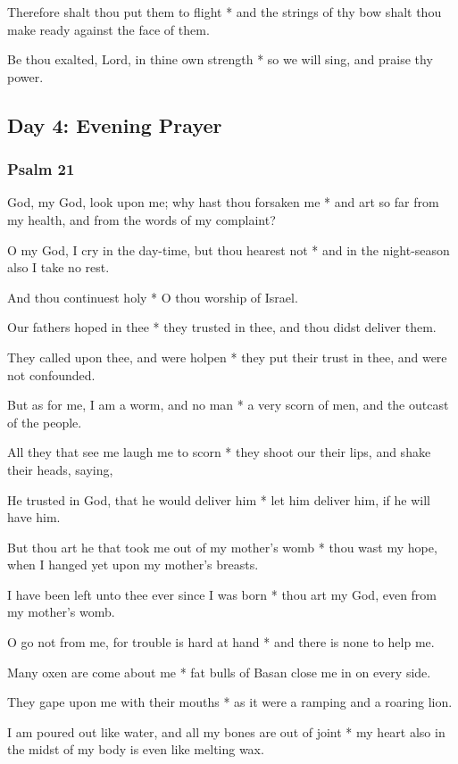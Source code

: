 Therefore shalt thou put them to flight * and the strings of thy bow shalt thou make ready against the face of them.

Be thou exalted, Lord, in thine own strength * so we will sing, and praise thy power.

\subsection{Day 4: Evening Prayer}

\subsubsection{Psalm 21}


 God, my God, look upon me; why hast thou forsaken me * and art so far from my health, and from the words of my complaint?

O my God, I cry in the day-time, but thou hearest not * and in the night-season also I take no rest.

And thou continuest holy * O thou worship of Israel.

Our fathers hoped in thee * they trusted in thee, and thou didst deliver them.

They called upon thee, and were holpen * they put their trust in thee, and were not confounded.

But as for me, I am a worm, and no man * a very scorn of men, and the outcast of the people.

All they that see me laugh me to scorn * they shoot our their lips, and shake their heads, saying,

He trusted in God, that he would deliver him * let him deliver him, if he will have him.

But thou art he that took me out of my mother's womb * thou wast my hope, when I hanged yet upon my mother's breasts.

I have been left unto thee ever since I was born * thou art my God, even from my mother's womb.

O go not from me, for trouble is hard at hand * and there is none to help me.

Many oxen are come about me * fat bulls of Basan close me in on every side.

They gape upon me with their mouths * as it were a ramping and a roaring lion.

I am poured out like water, and all my bones are out of joint * my heart also in the midst of my body is even like melting wax.

